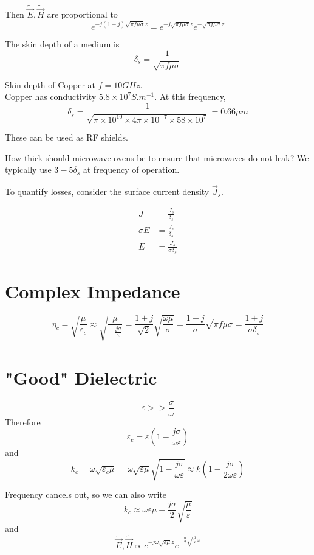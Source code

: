 \documentclass[12pt]{article}
\begin{document}
Then $\tilde{\vec E}, \tilde{\vec H}$ are proportional to
$$e^{-j(1-j)\sqrt{\pi f\mu\sigma}z} = e^{-j\sqrt{\pi f\mu\sigma}z} e^{-\sqrt{\pi f\mu\sigma}z}$$

\begin{defn}
    The skin depth of a medium is
    $$\delta_s = \frac{1}{\sqrt{\pi f\mu\sigma}}$$
\end{defn}

\begin{ex}
    Skin depth of Copper at $f = 10\unit{GHz}$. \\
    Copper has conductivity $5.8 \times 10^7\unit{S.m^{-1}}$. At this frequency,
    $$\delta_s = \frac{1}{\sqrt{\pi \times 10^{10} \times 4\pi \times 10^{-7} \times 58 \times 10^7}} = 0.66\unit{\mu m}$$
\end{ex}

These can be used as RF shields.

\begin{ex}
    How thick should microwave ovens be to ensure that microwaves do not leak? We typically use $3-5\delta_s$ at frequency of operation.
\end{ex}

To quantify losses, consider the surface current density $\vec J_s$.

\begin{align*}
    J &= \frac{J_s}{\delta_s} \\
    \sigma E &= \frac{J_s}{\delta_s} \\
    E &= \frac{J_s}{\sigma\delta_s}
\end{align*}

\section{Complex Impedance}

$$\eta_c = \sqrt{\frac{\mu}{\varepsilon_c}} \approx \sqrt{\frac{\mu}{-\frac{j\sigma}{\omega}}} = \frac{1+j}{\sqrt{2}}\sqrt{\frac{\omega\mu}{\sigma}} = \frac{1+j}{\sigma}\sqrt{\pi f\mu\sigma} = \frac{1+j}{\sigma\delta_s}$$

\section{"Good" Dielectric}

$$\varepsilon >> \frac{\sigma}{\omega}$$
Therefore
$$\varepsilon_c = \varepsilon\left(1 - \frac{j\sigma}{\omega\varepsilon}\right)$$
and
$$k_c = \omega\sqrt{\varepsilon_c\mu} = \omega\sqrt{\varepsilon\mu}\sqrt{1 - \frac{j\sigma}{\omega\varepsilon}} \approx k\left(1 - \frac{j\sigma}{2\omega\varepsilon}\right)$$

Frequency cancels out, so we can also write
$$k_c \approx \omega{\varepsilon\mu} - \frac{j\sigma}{2}\sqrt{\frac{\mu}{\varepsilon}}$$
and
$$\tilde{\vec E},\tilde{\vec H} \propto e^{-j\omega\sqrt{\varepsilon\mu}z}e^{-\frac{\sigma}{2}\sqrt{\frac{\mu}{\varepsilon}}z}$$
\end{document}
